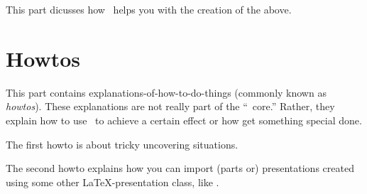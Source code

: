 \documentclass{ltxdoc}
\begin{document}
This part dicusses how \beamer\ helps you with the creation of the
above.










\part{Howtos}

This part contains explanations-of-how-to-do-things (commonly known as
\emph{howtos}). These explanations are not really part of the
``\beamer\ core.'' Rather, they explain how to use \beamer\ to achieve
a certain effect or how get something special done.

The first howto is about tricky uncovering situations.

The second howto explains how you can import (parts or) presentations
created using some other \LaTeX-presentation class, like \prosper. 





\printindex
\end{document}
